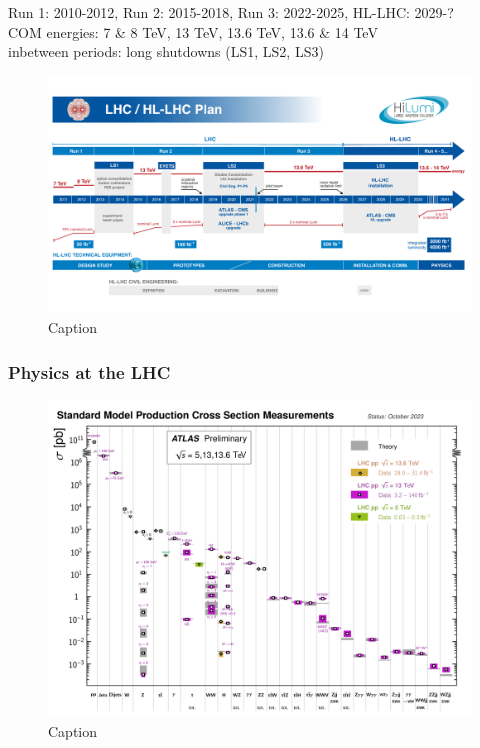 \documentclass[../thesis.tex]{subfiles}
\begin{document}
Run 1: 2010-2012, Run 2: 2015-2018, Run 3: 2022-2025, HL-LHC: 2029-?\\
COM energies: 7 \& 8 TeV, 13 TeV, 13.6 TeV, 13.6 \& 14 TeV\\


inbetween periods: long shutdowns (LS1, LS2, LS3)\\

\begin{figure}[!htbp]
\begin{center}
\includegraphics[width=\linewidth]{fig/lhc_hl_lhc.pdf}
\caption[Caption]{\label{fig:lhc:hl_lhc}Caption \citep{lhc:hl_lhc}}
\end{center}
\end{figure}

\subsubsection*{Physics at the LHC}

\begin{figure}[!htbp]
\begin{center}
\includegraphics[width=\linewidth]{fig/lhc_xsec_Run23.png}
\caption[Caption]{\label{fig:lhc:xsec}Caption \citep{ATL-PHYS-PUB-2023-039}}
\end{center}
\end{figure}
\end{document}
